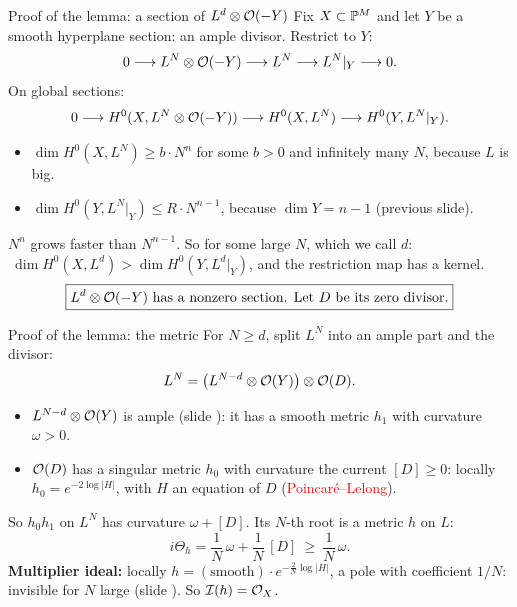 \begin{frame}{Proof of the lemma: a section of \(L^d\otimes\mathcal O(-Y)\)}
\label{fr:kv-proof-3}
Fix \(X\subset\mathbb P^M\) and let \(Y\) be a smooth hyperplane section: an ample divisor. Restrict to \(Y\):
\[
0\longrightarrow L^N\otimes\mathcal O(-Y)\longrightarrow L^N\longrightarrow L^N|_Y\longrightarrow0 .
\]
On global sections:
\vspace{-3pt}
\[
0\longrightarrow H^0(X,L^N\otimes\mathcal O(-Y))\longrightarrow H^0(X,L^N)\longrightarrow H^0(Y,L^N|_Y).
\]
\begin{itemize}
\setlength{\itemsep}{2pt}
\item \(\dim H^0(X,L^N)\ge b\cdot N^n\) for some \(b>0\) and infinitely many \(N\), because \(L\) is big.
\item \(\dim H^0(Y,L^N|_Y)\le R\cdot N^{n-1}\), because \(\dim Y=n-1\) (previous slide).
\end{itemize}
\(N^n\) grows faster than \(N^{n-1}\). So for some large \(N\), which we call \(d\): \(\ \dim H^0(X,L^d)>\dim H^0(Y,L^d|_Y)\), and the restriction map has a kernel.
\[
\boxed{L^d\otimes\mathcal O(-Y)\ \text{has a nonzero section. Let } D \text{ be its zero divisor.}}
\]
\end{frame}

\begin{frame}{Proof of the lemma: the metric}
\label{fr:kv-proof-4}
For \(N\ge d\), split \(L^N\) into an ample part and the divisor:
\[
L^N=\bigl(L^{N-d}\otimes\mathcal O(Y)\bigr)\otimes\mathcal O(D).
\]
\begin{itemize}
\setlength{\itemsep}{2pt}
\item \(L^{N-d}\otimes\mathcal O(Y)\) is ample (slide \hyperlink{fr:kv-nef-ample}{\pageref{fr:kv-nef-ample}}): it has a smooth metric \(h_1\) with curvature \(\omega>0\).
\item \(\mathcal O(D)\) has a singular metric \(h_0\) with curvature the current \([D]\ge0\): locally \(h_0=e^{-2\log|H|}\), with \(H\) an equation of \(D\) (\textcolor{red}{Poincaré--Lelong}).
\end{itemize}
So \(h_0h_1\) on \(L^N\) has curvature \(\omega+[D]\). Its \(N\)-th root is a metric \(h\) on \(L\):
\[
\boxed{i\Theta_h=\frac1N\,\omega+\frac1N\,[D]\ \ge\ \frac1N\,\omega .}
\]
\textbf{Multiplier ideal:} locally \(h=(\text{smooth})\cdot e^{-\frac2N\log|H|}\), a pole with coefficient \(1/N\): invisible for \(N\) large (slide \hyperlink{fr:kv-proof-2}{\pageref{fr:kv-proof-2}}). So \(\mathcal I(h)=\mathcal O_X\).
\end{frame}


